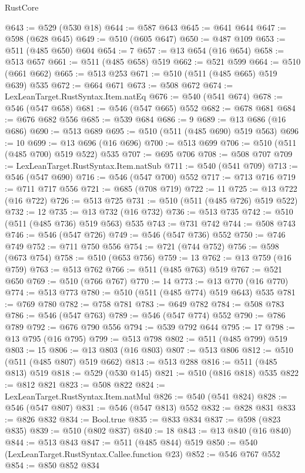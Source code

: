 \begin{lexlean}{RustCore}
\begin{coremodule}
@643 := @529 (@530 @18)
@644 := @587 @643
@645 := @641 @644
@647 := @598 (@628 @645)
@649 := @510 (@605 @647)
@650 := @487 @109
@653 := @511 (@485 @650) @604
@654 := 7
@657 := @13 @654 (@16 @654)
@658 := @513 @657
@661 := @511 (@485 @658) @519
@662 := @521 @599
@664 := @510 (@661 @662)
@665 := @513 @253
@671 := @510 (@511 (@485 @665) @519 @639) @535
@672 := @664 @671
@673 := @508 @672
@674 := LexLeanTarget.RustSyntax.Item.natEq
@676 := @540 (@541 @674)
@678 := @546 (@547 @658)
@681 := @546 (@547 @665) @552
@682 := @678 @681
@684 := @676 @682 @556
@685 := @539 @684
@686 := 9
@689 := @13 @686 (@16 @686)
@690 := @513 @689
@695 := @510 (@511 (@485 @690) @519 @563)
@696 := 10
@699 := @13 @696 (@16 @696)
@700 := @513 @699
@706 := @510 (@511 (@485 @700) @519 @522) @535
@707 := @695 @706
@708 := @508 @707
@709 := LexLeanTarget.RustSyntax.Item.natSub
@711 := @540 (@541 @709)
@713 := @546 (@547 @690)
@716 := @546 (@547 @700) @552
@717 := @713 @716
@719 := @711 @717 @556
@721 := @685 (@708 @719)
@722 := 11
@725 := @13 @722 (@16 @722)
@726 := @513 @725
@731 := @510 (@511 (@485 @726) @519 @522)
@732 := 12
@735 := @13 @732 (@16 @732)
@736 := @513 @735
@742 := @510 (@511 (@485 @736) @519 @563) @535
@743 := @731 @742
@744 := @508 @743
@746 := @546 (@547 @726)
@749 := @546 (@547 @736) @552
@750 := @746 @749
@752 := @711 @750 @556
@754 := @721 (@744 @752)
@756 := @598 (@673 @754)
@758 := @510 (@653 @756)
@759 := 13
@762 := @13 @759 (@16 @759)
@763 := @513 @762
@766 := @511 (@485 @763) @519
@767 := @521 @650
@769 := @510 (@766 @767)
@770 := 14
@773 := @13 @770 (@16 @770)
@774 := @513 @773
@780 := @510 (@511 (@485 @774) @519 @643) @535
@781 := @769 @780
@782 := @758 @781
@783 := @649 @782
@784 := @508 @783
@786 := @546 (@547 @763)
@789 := @546 (@547 @774) @552
@790 := @786 @789
@792 := @676 @790 @556
@794 := @539 @792 @644
@795 := 17
@798 := @13 @795 (@16 @795)
@799 := @513 @798
@802 := @511 (@485 @799) @519
@803 := 15
@806 := @13 @803 (@16 @803)
@807 := @513 @806
@812 := @510 (@511 (@485 @807) @519 @662)
@813 := @513 @288
@816 := @511 (@485 @813) @519
@818 := @529 (@530 @145)
@821 := @510 (@816 @818) @535
@822 := @812 @821
@823 := @508 @822
@824 := LexLeanTarget.RustSyntax.Item.natMul
@826 := @540 (@541 @824)
@828 := @546 (@547 @807)
@831 := @546 (@547 @813) @552
@832 := @828 @831
@833 := @826 @832
@834 := Bool.true
@835 := @833 @834
@837 := @598 (@823 @835)
@839 := @510 (@802 @837)
@840 := 18
@843 := @13 @840 (@16 @840)
@844 := @513 @843
@847 := @511 (@485 @844) @519
@850 := @540 (LexLeanTarget.RustSyntax.Callee.function @23)
@852 := @546 @767 @552
@854 := @850 @852 @834

\end{coremodule}
\end{lexlean}
